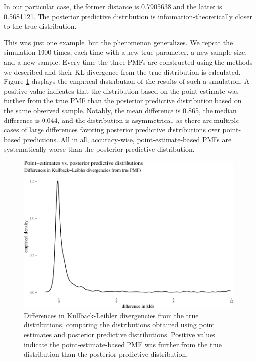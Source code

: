 \documentclass[
  10pt,
  dvipsnames,enabledeprecatedfontcommands]{scrartcl}
\begin{document}
In our particular case, the former distance is 0.7905638 and the latter
is 0.5681121. The posterior predictive distribution is
information-theoretically closer to the true distribution.

This was just one example, but the phenomenon generalizes. We repeat the
simulation 1000 times, each time with a new true parameter, a new sample
size, and a new sample. Every time the three PMFs are constructed using
the methods we described and their KL divergence from the true
distribution is calculated. Figure \ref{fig:kldsPlots} displays the
empirical distribution of the results of such a simulation. A positive
value indicates that the distribution based on the point-estimate was
further from the true PMF than the posterior predictive distribution
based on the same observed sample. Notably, the mean difference is
0.865, the median difference is 0.044, and the distribution is
asymmetrical, as there are multiple cases of large differences favoring
posterior predictive distributions over point-based predictions. All in
all, accuracy-wise, point-estimate-based PMFs are systematically worse
than the posterior predictive distribution.

\begin{figure}[H]

\begin{center}\includegraphics[width=0.7\linewidth]{imprecision_philosophical_paper._files/figure-latex/fig:kldsPlots-1} \end{center}
\caption{Differences in Kullback-Leibler divergencies from the true distributions, comparing the distributions obtained using point estimates and posterior predictive distributions. Positive values indicate the point-estimate-based PMF was further from the true distribution than the posterior predictive distribution.}
\label{fig:kldsPlots}
\end{figure}
\end{document}
